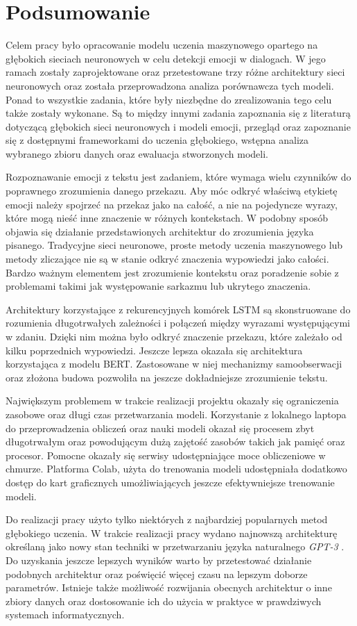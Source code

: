 \chapter{Podsumowanie}

Celem pracy było opracowanie modelu uczenia maszynowego opartego na głębokich sieciach neuronowych w celu detekcji emocji w dialogach. W jego ramach zostały zaprojektowane oraz przetestowane trzy różne architektury sieci neuronowych oraz została przeprowadzona analiza porównawcza tych modeli. Ponad to wszystkie zadania, które były niezbędne do zrealizowania tego celu także zostały wykonane. Są to między innymi zadania zapoznania się z literaturą dotyczącą głębokich sieci neuronowych i modeli emocji, przegląd oraz zapoznanie się z dostępnymi frameworkami do uczenia głębokiego, wstępna analiza wybranego zbioru danych oraz ewaluacja stworzonych modeli.

Rozpoznawanie emocji z tekstu jest zadaniem, które wymaga wielu czynników do poprawnego zrozumienia danego przekazu. Aby móc odkryć właściwą etykietę emocji należy spojrzeć na przekaz jako na całość, a nie na pojedyncze wyrazy, które mogą nieść inne znaczenie w różnych kontekstach. W podobny sposób objawia się działanie przedstawionych architektur do zrozumienia języka pisanego. Tradycyjne sieci neuronowe, proste metody uczenia maszynowego lub metody zliczające nie są w stanie odkryć znaczenia wypowiedzi jako całości. Bardzo ważnym elementem jest zrozumienie kontekstu oraz poradzenie sobie z problemami takimi jak występowanie sarkazmu lub ukrytego znaczenia.

Architektury korzystające z rekurencyjnych komórek LSTM są skonstruowane do rozumienia długotrwałych zależności i połączeń między wyrazami występującymi w zdaniu. Dzięki nim można było odkryć znaczenie przekazu, które zależało od kilku poprzednich wypowiedzi. Jeszcze lepsza okazała się architektura korzystająca z modelu BERT. Zastosowane w niej mechanizmy samoobserwacji oraz złożona budowa pozwoliła na jeszcze dokładniejsze zrozumienie tekstu.

Największym problemem w trakcie realizacji projektu okazały się ograniczenia zasobowe oraz długi czas przetwarzania modeli. Korzystanie z lokalnego laptopa do przeprowadzenia obliczeń oraz nauki modeli okazał się procesem zbyt długotrwałym oraz powodującym dużą zajętość zasobów takich jak pamięć oraz procesor. Pomocne okazały się serwisy udostępniające moce obliczeniowe w chmurze. Platforma Colab, użyta do trenowania modeli udostępniała dodatkowo dostęp do kart graficznych umożliwiających jeszcze efektywniejsze trenowanie modeli.

Do realizacji pracy użyto tylko niektórych z najbardziej popularnych metod głębokiego uczenia. W trakcie realizacji pracy wydano najnowszą architekturę określaną jako nowy stan techniki w przetwarzaniu języka naturalnego \textit{GPT-3} \cite{brown2020language}. Do uzyskania jeszcze lepszych wyników warto by przetestować działanie podobnych architektur oraz poświęcić więcej czasu na lepszym doborze parametrów. Istnieje także możliwość rozwijania obecnych architektur o inne zbiory danych oraz dostosowanie ich do użycia w praktyce w prawdziwych systemach informatycznych.